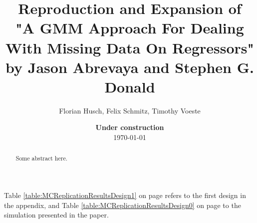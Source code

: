 \documentclass[11pt, a4paper, leqno]{article}
\begin{document}
\title{Reproduction and Expansion of \\"A GMM Approach For Dealing With Missing Data On Regressors" by Jason Abrevaya and Stephen G. Donald}

\author{Florian Husch, Felix Schmitz, Timothy Voeste}

\date{
    {\bf Under construction}
    \\[1ex]
    \today
}

\maketitle
{}

\begin{abstract}
    Some abstract here.
\end{abstract}

\clearpage



Table \ref{table:MCReplicationResultsDesign1} on page \pageref{table:MCReplicationResultsDesign1}
refers to the first design in the appendix, and Table \ref{table:MCReplicationResultsDesign0} on page \pageref{table:MCReplicationResultsDesign0}
to the simulation presented in the paper.


\end{document}
